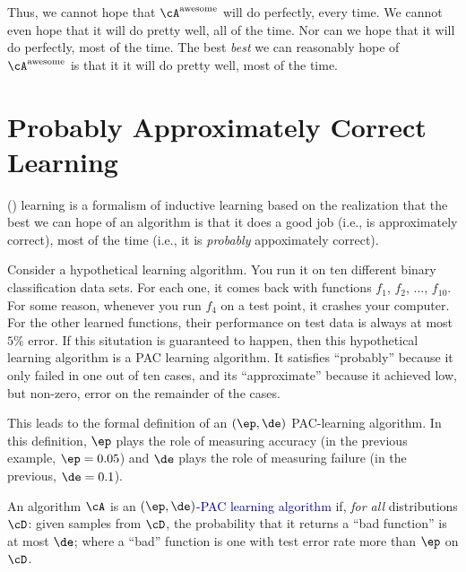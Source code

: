 Thus, we cannot hope that $\cA^{\text{awesome}}$ will do perfectly,
every time.  We cannot even hope that it will do pretty well, all of
the time.  Nor can we hope that it will do perfectly, most of the
time.  The best \emph{best} we can reasonably hope of
$\cA^{\text{awesome}}$ is that it it will do pretty well, most of the
time.

\section{Probably Approximately Correct Learning}

 () learning is a
formalism of inductive learning based on the realization that the best
we can hope of an algorithm is that it does a good job (i.e., is
approximately correct), most of the time (i.e., it is \emph{probably}
appoximately correct).

Consider a hypothetical learning algorithm.  You run it on ten
different binary classification data sets.  For each one, it comes
back with functions $f_1$, $f_2$, $\dots$, $f_{10}$.  For some reason,
whenever you run $f_4$ on a test point, it crashes your computer.  For
the other learned functions, their performance on test data is always
at most $5\%$ error.  If this situtation is guaranteed to happen, then
this hypothetical learning algorithm is a PAC learning algorithm.  It
satisfies ``probably'' because it only failed in one out of ten cases,
and its ``approximate'' because it achieved low, but non-zero, error
on the remainder of the cases.

This leads to the formal definition of an $(\ep,\de)$ PAC-learning
algorithm.  In this definition, $\ep$ plays the role of measuring
accuracy (in the previous example, $\ep = 0.05$) and $\de$ plays the
role of measuring failure (in the previous, $\de = 0.1$).  

\begin{definition}
  An algorithm $\cA$ is an \textcolor{darkblue}{$(\ep,\de)$-PAC
    learning algorithm} if, \emph{for all} distributions $\cD$: given
  samples from $\cD$, the probability that it returns a ``bad
  function'' is at most $\de$; where a ``bad'' function is one with
  test error rate more than $\ep$ on $\cD$.
\end{definition}

